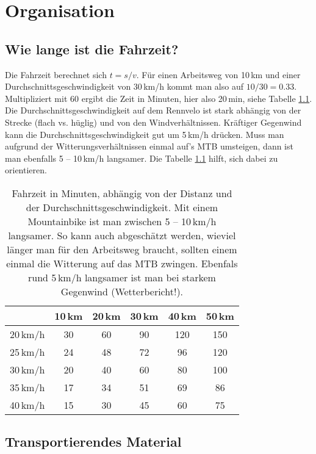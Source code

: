 \chapter{Organisation}

\section{Wie lange ist die Fahrzeit?}

Die Fahrzeit berechnet sich $t = s/v$. Für einen Arbeitsweg von 10\,km und einer Durchschnittsgeschwindigkeit von 30\,km/h kommt man also auf $10/30=0.33$.
Multipliziert mit 60 ergibt die Zeit in Minuten, hier also 20\,min, siehe Tabelle \ref{tab:fahrzeit}.
Die Durchschnittsgeschwindigkeit auf dem Rennvelo ist stark abhängig von der Strecke (flach vs. hüglig) und von den Windverhältnissen.
Kräftiger Gegenwind kann die Durchschnittsgeschwindigkeit gut um 5\,km/h drücken.
Muss man aufgrund der Witterungsverhältnissen einmal auf's MTB umsteigen, dann ist man ebenfalls 5 -- 10\,km/h langsamer.
Die Tabelle \ref{tab:fahrzeit} hilft, sich dabei zu orientieren.

\begin{table}
        \centering
        \begin{tabular}{cccccc}
                \toprule
            &	10\,km	&   20\,km	& 30\,km	&   40\,km	& 50\,km    \\
    \midrule
20\,km/h	&   30      &	60	    & 90        &   120	    & 150       \\
25\,km/h	&   24      &	48 &	72 &	96 &	120  \\
30\,km/h	&   20      &	40 & 	60& 	80 &	100 \\
35\,km/h	&   17      &	34 &	51& 	69 &	86 \\
40\,km/h	&   15      &	30 &	45& 	60 &	75 \\
\bottomrule
        \end{tabular}
        \caption{Fahrzeit in Minuten, abhängig von der Distanz und der Durchschnittsgeschwindigkeit.
        Mit einem Mountainbike ist man zwischen 5 -- 10\,km/h langsamer.
        So kann auch abgeschätzt werden, wieviel länger man für den Arbeitsweg braucht,
        sollten einem einmal die Witterung auf das MTB zwingen.
        Ebenfals rund 5\,km/h langsamer ist man bei starkem Gegenwind (Wetterbericht!).}
        \label{tab:fahrzeit}
\end{table}

\section{Transportierendes Material}

